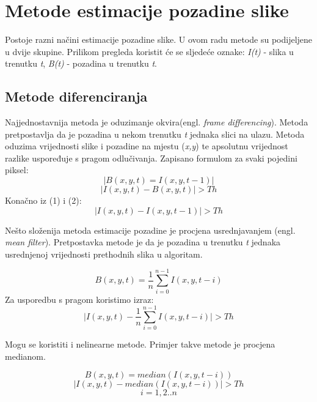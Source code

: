 \documentclass[a4paper,twocolumn]{article}
\providecommand{\abs}[1]{\lvert#1\rvert}
\begin{document}
\section{Metode estimacije pozadine slike}
Postoje razni načini estimacije pozadine slike. U ovom radu metode su
podijeljene u dvije skupine. Prilikom pregleda koristit će se sljedeće oznake:
\textit{I(t)} - slika u trenutku \textit{t}, \textit{B(t)} - pozadina u trenutku
\textit{t}.

\subsection{Metode diferenciranja}
Najjednostavnija metoda je oduzimanje okvira(engl. \textit{frame differencing}).
Metoda pretpostavlja da je pozadina u nekom trenutku \textit{t} jednaka slici
na ulazu. Metoda oduzima vrijednosti slike i pozadine na mjestu (\textit{x,y})
te apsolutnu vrijednost razlike uspoređuje s pragom odlučivanja. Zapisano
formulom za svaki pojedini piksel:
\begin{equation}
\abs{B(x, y, t) = I(x, y, t - 1)}
\end{equation}
\begin{equation}
\abs{I(x, y, t) - B(x, y, t)} > Th
\end{equation}
Konačno iz (1) i (2):
\begin{equation}
\abs{I(x, y, t) - I(x, y, t - 1)} > Th
\end{equation}

Nešto složenija metoda estimacije pozadine je procjena usrednjavanjem (engl.
\textit{mean filter}). Pretpostavka metode je da je pozadina u trenutku
\textit{t} jednaka usrednjenoj vrijednosti prethodnih slika u algoritam.

\begin{equation}
B(x, y, t) = \frac{1}{n}\sum\limits_{i=0}^{n-1}I(x, y, t - i)
\end{equation}
Za usporedbu s pragom koristimo izraz:
\begin{equation}
\abs{I(x, y, t) - \frac{1}{n}\sum\limits_{i=0}^{n-1}I(x, y, t - i)} > Th
\end{equation}

Mogu se koristiti i nelinearne metode. Primjer takve metode je procjena
medianom.

\begin{equation}
B(x, y, t) = median{(I(x, y, t - i))}
\end{equation}
\begin{equation}
\abs{I(x, y, t) - median{(I(x, y, t - i))}} > Th
\end{equation}
\begin{equation*}
i = 1,2..n
\end{equation*}
\end{document}
